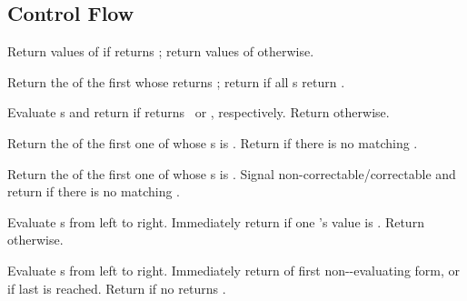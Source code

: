 \subsection{Control Flow}
\begin{LIST}{1cm}

  {
    Return values of  if  returns \T;
    return values of  otherwise. 
  }

  {
  Return the  of the first
   whose  returns \T; return
  \retval{\NIL} if all s return \NIL.
  }

  {
  Evaluate s and return  if 
  returns \T\ or \NIL, respectively. Return \retval{\NIL} otherwise. 
  }

  {
  Return the  of the first  one of whose s is
   .
  Return  if there is no matching . 
  }

  {
  Return the  of the first  one of whose s is 
  . Signal non-correctable/correctable  and
  return \retval{\NIL} if there is no matching . 
  }

  {
  Evaluate s from left to
  right. Immediately return \retval{\NIL} if one 's value is \NIL. Return
   otherwise.
  }

  {
  Evaluate s from left to
  right. Immediately return  of first
  non-\NIL-evaluating form, or  if last 
  is reached. Return \retval{\NIL} if no  returns \T.
  }


\end{LIST}

